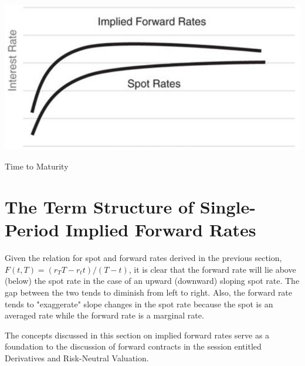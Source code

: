 \documentclass[11pt]{article}
\begin{document}
\begin{center}
\includegraphics[max width=\textwidth]{2024_04_10_de0b0b0f0220b08f4859g-3}
\end{center}

Time to Maturity

\section*{The Term Structure of Single-Period Implied Forward Rates}
Given the relation for spot and forward rates derived in the previous section, $F(t, T)=\left(r_{T} T-r_{t} t\right) /(T-t)$, it is clear that the forward rate will lie above (below) the spot rate in the case of an upward (downward) sloping spot rate. The gap between the two tends to diminish from left to right. Also, the forward rate tends to "exaggerate" slope changes in the spot rate because the spot is an averaged rate while the forward rate is a marginal rate.

The concepts discussed in this section on implied forward rates serve as a foundation to the discussion of forward contracts in the session entitled Derivatives and Risk-Neutral Valuation.
\end{document}
